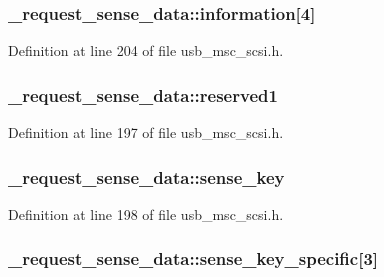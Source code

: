 \subsubsection[{\texorpdfstring{information}{information}}]{ \+\_\+request\+\_\+sense\+\_\+data\+::information\mbox{[}4\mbox{]}}\hypertarget{struct__request__sense__data_ab8a2721dab84cfd2a096df32a67a7c20}{}\label{struct__request__sense__data_ab8a2721dab84cfd2a096df32a67a7c20}


Definition at line 204 of file usb\+\_\+msc\+\_\+scsi.\+h.

\subsubsection[{\texorpdfstring{reserved1}{reserved1}}]{ \+\_\+request\+\_\+sense\+\_\+data\+::reserved1}\hypertarget{struct__request__sense__data_acbe76517557b3ec99a74e8d10c278d69}{}\label{struct__request__sense__data_acbe76517557b3ec99a74e8d10c278d69}


Definition at line 197 of file usb\+\_\+msc\+\_\+scsi.\+h.

\subsubsection[{\texorpdfstring{sense\+\_\+key}{sense_key}}]{ \+\_\+request\+\_\+sense\+\_\+data\+::sense\+\_\+key}\hypertarget{struct__request__sense__data_aaeca04a72e29a449f60d203db85f9acc}{}\label{struct__request__sense__data_aaeca04a72e29a449f60d203db85f9acc}


Definition at line 198 of file usb\+\_\+msc\+\_\+scsi.\+h.

\subsubsection[{\texorpdfstring{sense\+\_\+key\+\_\+specific}{sense_key_specific}}]{ \+\_\+request\+\_\+sense\+\_\+data\+::sense\+\_\+key\+\_\+specific\mbox{[}3\mbox{]}}\hypertarget{struct__request__sense__data_ad8858e6190ae797c8a27ea8c92a2d013}{}\label{struct__request__sense__data_ad8858e6190ae797c8a27ea8c92a2d013}


